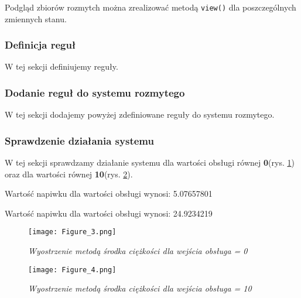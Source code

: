 Podgląd zbiorów rozmytch można zrealizować metodą \verb|view()| dla poszczególnych zmiennych stanu.



\subsubsection{Definicja reguł}\label{ssc:definicja_regul}

W tej sekcji definiujemy reguły.



\subsubsection{Dodanie reguł do systemu rozmytego}\label{ssc:dodanie_regul}

W tej sekcji dodajemy powyżej zdefiniowane reguły do systemu rozmytego.



\subsubsection{Sprawdzenie działania systemu}\label{ssc:sprawdzenie_dzialania}

W tej sekcji sprawdzamy działanie systemu dla wartości obsługi równej \textbf{0}(rys. \ref{fig:obsluga0}) oraz dla wartości równej \textbf{10}(rys. \ref{fig:obsluga10}).



Wartość napiwku dla wartości obsługi wynosi: 5.07657801

Wartość napiwku dla wartości obsługi wynosi: 24.9234219

\begin{figure}[H]
	\centering
	\texttt{[image: Figure\_3.png]}
	\caption{\textit{Wyostrzenie metodą środka ciężkości dla wejścia obsługa = 0}}
	\label{fig:obsluga0}
\end{figure}

\begin{figure}[H]
	\centering
	\texttt{[image: Figure\_4.png]}
	\caption{\textit{Wyostrzenie metodą środka ciężkości dla wejścia obsługa = 10}}
	\label{fig:obsluga10}

\end{figure}

